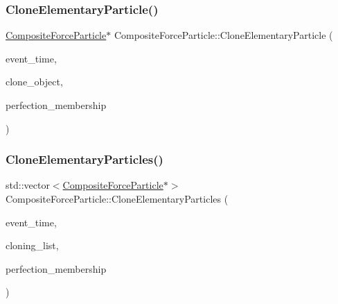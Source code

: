 \mbox{\label{class_composite_force_particle_a559031016355b79ee795e621fdbbdb13}} 
\subsubsection{\texorpdfstring{Clone\+Elementary\+Particle()}{CloneElementaryParticle()}}
{\footnotesize\ttfamily \mbox{\hyperlink{class_composite_force_particle}{Composite\+Force\+Particle}}$\ast$ Composite\+Force\+Particle\+::\+Clone\+Elementary\+Particle (\begin{DoxyParamCaption}\item[{std\+::chrono\+::time\+\_\+point$<$ \mbox{\hyperlink{universe_8h_a0ef8d951d1ca5ab3cfaf7ab4c7a6fd80}{Clock}} $>$}]{event\+\_\+time,  }\item[{\mbox{\hyperlink{class_composite_force_particle}{Composite\+Force\+Particle}} $\ast$}]{clone\+\_\+object,  }\item[{double}]{perfection\+\_\+membership }\end{DoxyParamCaption})}

\mbox{\label{class_composite_force_particle_ac27e6d3bb56272728a8c197dbcd2db4e}} 
\subsubsection{\texorpdfstring{Clone\+Elementary\+Particles()}{CloneElementaryParticles()}}
{\footnotesize\ttfamily std\+::vector$<$\mbox{\hyperlink{class_composite_force_particle}{Composite\+Force\+Particle}}$\ast$$>$ Composite\+Force\+Particle\+::\+Clone\+Elementary\+Particles (\begin{DoxyParamCaption}\item[{std\+::chrono\+::time\+\_\+point$<$ \mbox{\hyperlink{universe_8h_a0ef8d951d1ca5ab3cfaf7ab4c7a6fd80}{Clock}} $>$}]{event\+\_\+time,  }\item[{std\+::vector$<$ \mbox{\hyperlink{class_composite_force_particle}{Composite\+Force\+Particle}} $\ast$$>$}]{cloning\+\_\+list,  }\item[{double}]{perfection\+\_\+membership }\end{DoxyParamCaption})}

